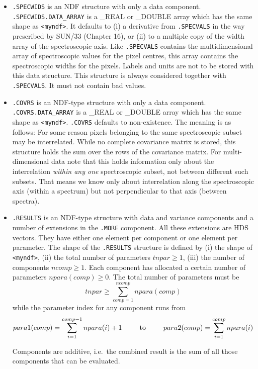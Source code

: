 \begin{itemize}
\item{\tt .SPECWIDS} is an NDF structure with only a data component. {\tt
.SPECWIDS.DATA\_\-ARRAY} is a \_REAL or \_DOUBLE array which has the same shape
as {\tt <myndf>}. It defaults to (i) a derivative from {\tt .SPECVALS}
in the way prescribed by SUN/33 (Chapter 16), or (ii) to a multiple copy
of the width array 
of the spectroscopic axis. Like {\tt .SPECVALS} contains the multidimensional
array of spectroscopic values for the pixel centres, this array contains the
spectroscopic widths for the pixels. Labels and units are not to be stored with
this data structure. This structure is always
considered together with {\tt .SPECVALS}. It must not contain bad values.

\item{\tt .COVRS} is an NDF-type structure with only a data component. {\tt
.COVRS.DATA\_ARRAY} is a \_REAL or \_DOUBLE array which has the same shape as
{\tt <myndf>}. {\tt .COVRS} defaults to non-existence. The meaning is as
follows: 
For some reason pixels belonging to the same spectroscopic subset may be
interrelated. While no complete covariance matrix is stored, this structure
holds the sum over the rows of the covariance matrix. For multi-dimensional
data note that this holds information only about the interrelation {\it within
any one} spectroscopic subset, not between different such subsets. That means
we know only about interrelation along the spectroscopic axis (within a
spectrum) but not perpendicular to that axis (between spectra).

\item{\tt .RESULTS} is an NDF-type structure with data and variance components
and a number of extensions in the {\tt .MORE} component. All these extensions
are HDS vectors. They have either one element per component or one element per
parameter. The shape of the {\tt .RESULTS} structure is defined by (i) the
shape of {\tt <myndf>}, (ii) the total number of parameters $tnpar\geq 1$,
(iii) the number of components $ncomp\geq 1$.
Each component has allocated a certain number of
parameters $npara(comp)\geq 0$. The total number of parameters must be
$$tnpar\geq\sum_{comp=1}^{ncomp}npara(comp)$$
while the parameter index for any component runs from
$$ para1(comp)=\sum_{i=1}^{comp-1}npara(i)+1
   \mbox{\phantom{mmm}to\phantom{mmm}}
   para2(comp)=\sum_{i=1}^{comp}npara(i)$$

Components are additive, i.e.\ the combined
result is the sum of all those components
that can be evaluated.


\end{itemize}
